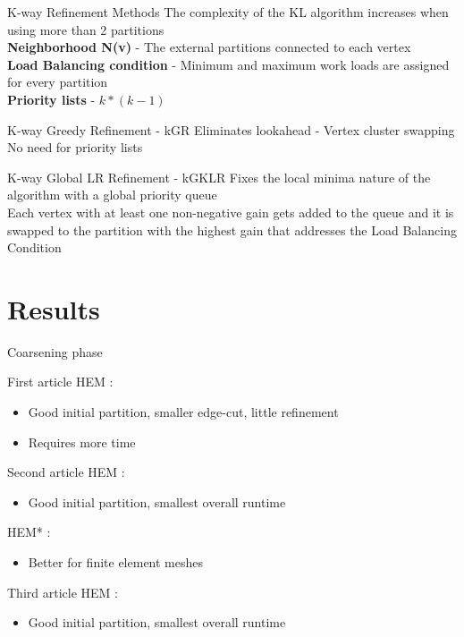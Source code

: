 \documentclass{beamer}
\begin{document}
	\begin{frame}{K-way Refinement Methods}
		The complexity of the KL algorithm increases when using more than 2 partitions \\
		\textbf{Neighborhood N(v)} - The external partitions connected to each vertex\\
		\textbf{Load Balancing condition} - Minimum and maximum work loads are assigned for every partition\\
		\textbf{Priority lists} - \(k*(k-1)\) 
		\begin{block}{K-way Greedy Refinement - kGR}
			Eliminates lookahead - Vertex cluster swapping\\
			No need for priority lists
		\end{block}
		\begin{block}{K-way Global LR Refinement - kGKLR}
			Fixes the local minima nature of the algorithm with a global priority queue\\
			Each vertex with at least one non-negative gain gets added to the queue and it is swapped to the partition with
			the highest gain that addresses the Load Balancing Condition 
		\end{block}
	\end{frame}
	\author[Q.~Diaferia]{Q.~Diaferia \and T.~Levasseur \and W.~Pei \and G.~Perez Bada}
	\section{Results}
	
	\begin{frame}{Coarsening phase}
		\begin{block}{First article}
			HEM :
			\begin{itemize}
				\item Good initial partition, smaller edge-cut, little refinement
				\item Requires more time
			\end{itemize}
		\end{block}
		\begin{block}{Second article}
			HEM :
			\begin{itemize}
				\item Good initial partition, smallest overall runtime
			\end{itemize}
			HEM* :
			\begin{itemize}
				\item Better for finite element meshes
			\end{itemize}
		\end{block}
		\begin{block}{Third article}
			HEM :
			\begin{itemize}
				\item Good initial partition, smallest overall runtime
			\end{itemize}
		\end{block}
	\end{frame}
	
\end{document}
